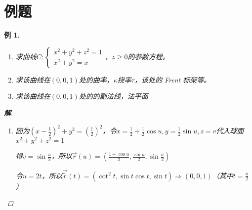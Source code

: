 \documentclass{article}                     %
\numberwithin{equation}{section}            %
\numberwithin{figure}{section}              %
\numberwithin{table}{section}               %
\newtheorem{example}{\indent 例}[section]
\newenvironment{solution}{\begin{proof}[\indent\bf 解]}{\end{proof}}
\begin{document}
\section{例题}
\begin{example}
    \begin{enumerate}
        \item 求曲线$C:\left\{\begin{matrix}x^2+y^2+z^2=1\\x^2+y^2=x\end{matrix}\right.$，$z\ge 0$的参数方程。
        \item 求该曲线在$(0,0,1)$处的曲率，$\kappa $挠率$\tau $，该处的 Frent 标架等。
        \item 求该曲线在$(0,0,1)$处的的副法线，法平面
    \end{enumerate}
    \begin{solution}
        \begin{enumerate}
            \item 因为$(x-\frac{1}{2})^2+y^2=(\frac{1}{2})^2$，令$x=\frac{1}{2}+\frac{1}{2}\cos{u},y=\frac{1}{2}\sin{u},z=v$代入球面$x^2+y^2+z^2=1$

            得$v=\sin{\frac{u}{2}}$，所以$\vec{r}(u)=(\frac{1+\cos{u}}{2},\frac{\sin{u}}{2},\sin{\frac{u}{2}})$
        
            令$u=2t$，所以$\vec{\tilde{r} }(t)=(\cot^2{t},\sin{t}\cos{t},\sin{t})\Rightarrow (0,0,1)$（其中$t=\frac{\pi}{2}$）
            

\end{enumerate}
\end{solution}
\end{example}
\end{document}
